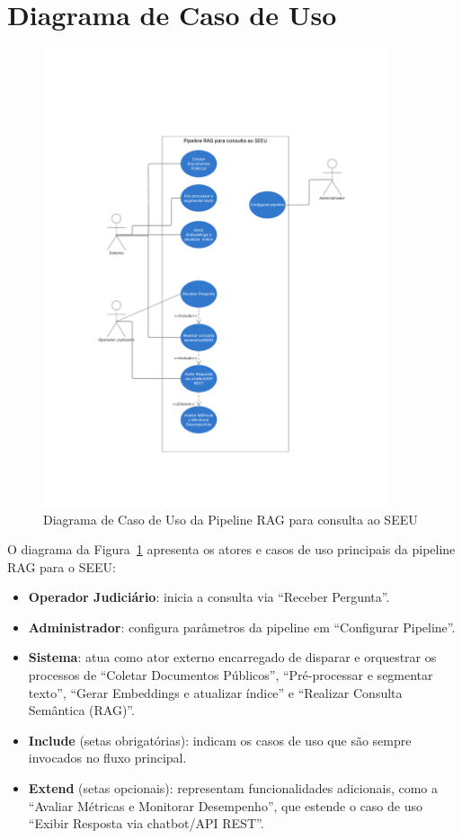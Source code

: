 \section{Diagrama de Caso de Uso}
\label{sec:diagrama-caso-uso}

\begin{figure}[H]
  \centering
  \includegraphics[width=0.9\textwidth]{04-figuras/diagrama_em_branco.pdf}
  \caption{Diagrama de Caso de Uso da Pipeline RAG para consulta ao SEEU}
  \label{fig:diagrama-rag-seeu}
\end{figure}

\noindent
O diagrama da Figura~\ref{fig:diagrama-rag-seeu} apresenta os atores e casos de uso principais da pipeline RAG para o SEEU:  
\begin{itemize}
  \item \textbf{Operador Judiciário}: inicia a consulta via “Receber Pergunta”.  
  \item \textbf{Administrador}: configura parâmetros da pipeline em “Configurar Pipeline”.  
  \item \textbf{Sistema}: atua como ator externo encarregado de disparar e orquestrar os processos de “Coletar Documentos Públicos”, “Pré-processar e segmentar texto”, “Gerar Embeddings e atualizar índice” e “Realizar Consulta Semântica (RAG)”.  
  \item \textbf{Include} (setas obrigatórias): indicam os casos de uso que são sempre invocados no fluxo principal.  
  \item \textbf{Extend} (setas opcionais): representam funcionalidades adicionais, como a “Avaliar Métricas e Monitorar Desempenho”, que estende o caso de uso “Exibir Resposta via chatbot/API REST”.  
\end{itemize}  


